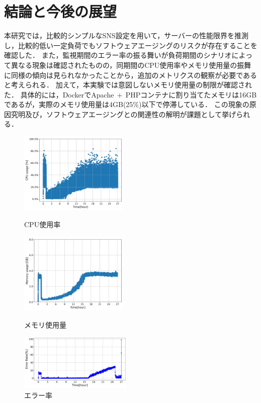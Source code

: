 \documentclass[twoside,twocolumn,10pt]{jarticle}  %
\begin{document}
\section{結論と今後の展望}
本研究では，比較的シンプルなSNS設定を用いて，サーバーの性能限界を推測し，比較的低い一定負荷でもソフトウェアエージングのリスクが存在することを確認した．
また，監視期間のエラー率の振る舞いが負荷期間のシナリオによって異なる現象は確認されたものの，同期間のCPU使用率やメモリ使用量の振舞に同様の傾向は見られなかったことから，追加のメトリクスの観察が必要であると考えられる．
加えて，本実験では意図しないメモリ使用量の制限が確認された．
具体的には，DockerでApache$~+~$PHPコンテナに割り当てたメモリは16GBであるが，実際のメモリ使用量は4GB(25\%)以下で停滞している．
この現象の原因究明及び，ソフトウェアエージングとの関連性の解明が課題として挙げられる．\par
\begin{figure}[t]
  \centering
  \includegraphics[width=5.2cm]{figures/8core_1_15rps_increase_cpu.png}
  \vspace{-0.5cm}
  \caption{CPU使用率}
  \label{f1}

  \centering
  \includegraphics[width=5.2cm]{figures/8core_1_15rps_increase_mem.png}
  \vspace{-0.5cm}
  \caption{メモリ使用量}
  \label{f2}

  \centering
  \includegraphics[width=5.4cm]{figures/or_8core_1_15_error_rate.png}
  \vspace{-0.5cm}
  \caption{エラー率}
  \label{f3}
  \vspace{-0.5cm}
\end{figure}
\end{document}
